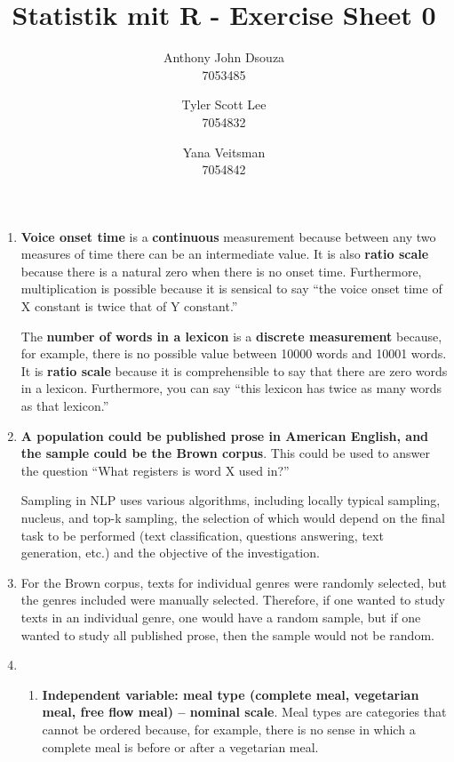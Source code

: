 \documentclass{article}
\title{\vspace {-30mm}\Large \bfseries \textsc Statistik mit R - Exercise Sheet 0}
\author{Anthony John Dsouza \\ 7053485 \and Tyler Scott Lee \\ 7054832 \and Yana Veitsman \\ 7054842 }
\date{} %
\begin{document}
	\maketitle
	\begin{enumerate}
		\item 
		
			\textbf{Voice onset time} is a \textbf{continuous} measurement because between any two measures of time there can be an intermediate value. It is also \textbf{ratio scale} because there is a natural zero when there is no onset time. Furthermore, multiplication is possible because it is sensical to say “the voice onset time of X constant is twice that of Y constant.” 
			
			
			The \textbf{number of words in a lexicon} is a \textbf{discrete measurement} because, for example, there is no possible value between 10000 words and 10001 words. It is \textbf{ratio scale} because it is comprehensible to say that there are zero words in a lexicon. Furthermore, you can say “this lexicon has twice as many words as that lexicon.”

		
		\item \textbf{A population could be published prose in American English, and the sample could be the Brown corpus}. This could be used to answer the question “What registers is word X used in?” 
		
		Sampling in NLP uses various algorithms, including locally typical sampling, nucleus, and top-k sampling, the selection of which would depend on the final task to be performed (text classification, questions answering, text generation, etc.) and the objective of the investigation.
		
		\item For the Brown corpus, texts for individual genres were randomly selected, but the genres included were manually selected. Therefore, if one wanted to study texts in an individual genre, one would have a random sample, but if one wanted to study all published prose, then the sample would not be random.
		
		
			\item
			\begin{enumerate}
				\item \textbf{Independent variable: meal type (complete meal, vegetarian meal, free flow meal) – nominal scale}. Meal types are categories that cannot be ordered because, for example, there is no sense in which a complete meal is before or after a vegetarian meal.
				

\end{enumerate}
\end{enumerate}
\end{document}
